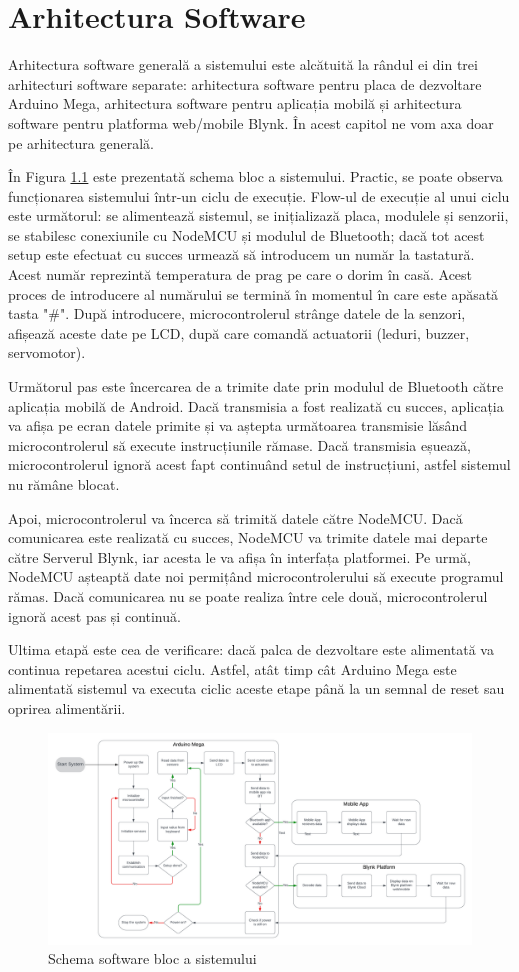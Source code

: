 \chapter{Arhitectura Software}
\thispagestyle{pagestyle}

Arhitectura software generală a sistemului este alcătuită la rândul ei din trei arhitecturi software separate: arhitectura software pentru placa de dezvoltare Arduino Mega, arhitectura software pentru aplicația mobilă și arhitectura software pentru platforma web/mobile Blynk. În acest capitol ne vom axa doar pe arhitectura generală.

În Figura \ref{fig:arhitectura_soft_general} este prezentată schema bloc a sistemului. Practic, se poate observa funcționarea sistemului într-un ciclu de execuție. Flow-ul de execuție al unui ciclu este următorul: se alimentează sistemul, se inițializază placa, modulele și senzorii, se stabilesc conexiunile cu NodeMCU și modulul de Bluetooth; dacă tot acest setup este efectuat cu succes urmează să introducem un număr la tastatură. Acest număr reprezintă temperatura de prag pe care o dorim în casă. Acest proces de introducere al numărului se termină în momentul în care este apăsată tasta "\#". După introducere, microcontrolerul strânge datele de la senzori, afișează aceste date pe LCD, după care comandă actuatorii (leduri, buzzer, servomotor).

Următorul pas este încercarea de a trimite date prin modulul de Bluetooth către aplicația mobilă de Android. Dacă transmisia a fost realizată cu succes, aplicația va afișa pe ecran datele primite și va aștepta următoarea transmisie lăsând microcontrolerul să execute instrucțiunile rămase. Dacă transmisia eșuează, microcontrolerul ignoră acest fapt continuând setul de instrucțiuni, astfel sistemul nu rămâne blocat.

Apoi, microcontrolerul va încerca să trimită datele către NodeMCU. Dacă comunicarea este realizată cu succes, NodeMCU va trimite datele mai departe către Serverul Blynk, iar acesta le va afișa în interfața platformei. Pe urmă, NodeMCU așteaptă date noi permițând microcontrolerului să execute programul rămas. Dacă comunicarea nu se poate realiza între cele două, microcontrolerul ignoră acest pas și continuă.

Ultima etapă este cea de verificare: dacă palca de dezvoltare este alimentată va continua repetarea acestui ciclu. Astfel, atât timp cât Arduino Mega este alimentată sistemul va executa ciclic aceste etape până la un semnal de reset sau oprirea alimentării.

\begin{figure}[H]
\includegraphics[width=1\textwidth, height=0.6\textwidth]{bachelors_ro/images/arhitectura_soft_general.png}
\caption{Schema software bloc a sistemului}
\label{fig:arhitectura_soft_general}
\end{figure}
